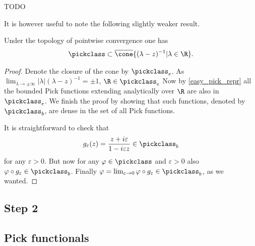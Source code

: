 TODO

It is however useful to note the following slightly weaker result.
\begin{lem}\label{pick_dense}
	Under the topology of pointwise convergence one has
	\begin{align*}
		\pickclass \subset \overline{\cone}\{(\lambda - z)^{-1} | \lambda \in \R\}.
	\end{align*}
\end{lem}
\begin{proof}
	Denote the closure of the cone by $\pickclass_{e}$. As $\lim_{\lambda \to \pm \infty}|\lambda|(\lambda - z)^{-1} = \pm 1$, $\R \in \pickclass_{e}$ Now by \ref{easy_pick_repr} all the bounded Pick functions extending analytically over $\R$ are also in $\pickclass_{e}$. We finish the proof by showing that such functions, denoted by $\pickclass_{b}$, are dense in the set of all Pick functions.

	It is straightforward to check that
	\begin{align*}
		g_{\varepsilon}(z) = \frac{z + i \varepsilon}{1 - i \varepsilon z} \in \pickclass_{b}
	\end{align*}
	for any $\varepsilon > 0$. But now for any $\varphi \in \pickclass$ and $\varepsilon > 0$ also $\varphi \circ g_{\varepsilon} \in \pickclass_{b}$. Finally $\varphi = \lim_{\varepsilon \to 0} \varphi \circ g_{\varepsilon} \in \pickclass_{b}$, as we wanted.
\end{proof}

\subsection{Step 2}



\subsection{Pick functionals}

